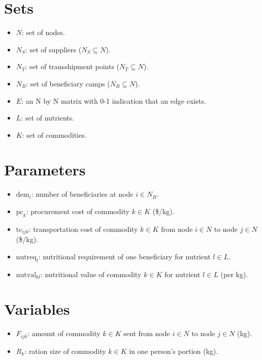 \documentclass{article}
\begin{document}
\section{Sets}
\begin{itemize}[leftmargin=*,nosep]
    \item $N$: set of nodes.
    \item $N_S$: set of suppliers ($N_S \subseteq N$).
    \item $N_T$: set of transshipment points ($N_T \subseteq N$).
    \item $N_B$: set of beneficiary camps ($N_B \subseteq N$).
    \item $E$: an N by N matrix with 0-1 indication that an edge exists.
    \item $L$: set of nutrients.
    \item $K$: set of commodities.
\end{itemize}

\section{Parameters}
\begin{itemize}[leftmargin=*,nosep]
    \item $\text{dem}_i$: number of beneficiaries at node $i \in N_B$.
    \item $\text{pc}_k$: procurement cost of commodity $k \in K$ (\$/kg).
    \item $\text{tc}_{ijk}$: transportation cost of commodity $k \in K$ from node $i \in N$ to node $j \in N$ (\$/kg).
    \item $\text{nutreq}_l$: nutritional requirement of one beneficiary for nutrient $l \in L$.
    \item $\text{nutval}_{kl}$: nutritional value of commodity $k \in K$ for nutrient $l \in L$ (per kg).
\end{itemize}

\section{Variables}
\begin{itemize}[leftmargin=*,nosep]
    \item $F_{ijk}$: amount of commodity $k \in K$ sent from node $i \in N$ to node $j \in N$ (kg).
    \item $R_k$: ration size of commodity $k \in K$ in one person's portion (kg).
\end{itemize}
\end{document}
